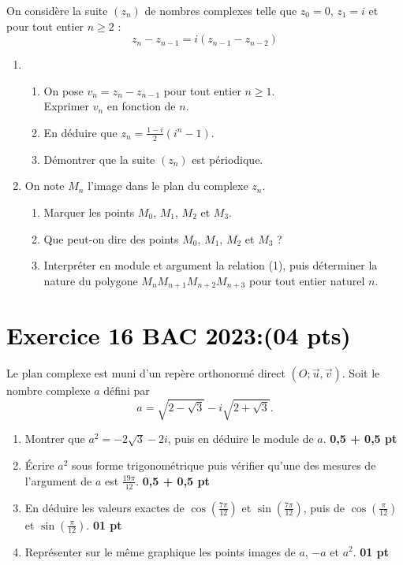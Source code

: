 \documentclass[12pt]{article}
\begin{document}
On considère la suite $(z_n)$ de nombres complexes telle que $z_0 = 0$, $z_1 = i$ et pour tout entier $n \geq 2$ :
\[
z_n - z_{n-1} = i(z_{n-1} - z_{n-2}) \tag{1}
\]

\begin{enumerate}
    \item
    \begin{enumerate}
        \item On pose $v_n = z_n - z_{n-1}$ pour tout entier $n \geq 1$. \\
        Exprimer $v_n$ en fonction de $n$.

        \item En déduire que $z_n = \frac{1 - i}{2}(i^n - 1)$.

        \item Démontrer que la suite $(z_n)$ est périodique.
    \end{enumerate}

    \item On note $M_n$ l’image dans le plan du complexe $z_n$.
    \begin{enumerate}
        \item Marquer les points $M_0$, $M_1$, $M_2$ et $M_3$.

        \item Que peut-on dire des points $M_0$, $M_1$, $M_2$ et $M_3$ ?

        \item Interpréter en module et argument la relation (1), puis déterminer la nature du polygone $M_nM_{n+1}M_{n+2}M_{n+3}$ pour tout entier naturel $n$.
    \end{enumerate}
\end{enumerate}
\section*{\textcolor{black}{Exercice 16 BAC 2023:(04 pts)}}

Le plan complexe est muni d’un repère orthonormé direct $(O; \vec{u}, \vec{v})$. Soit le nombre complexe $a$ défini par 
\[
a = \sqrt{2 - \sqrt{3}} - i\sqrt{2 + \sqrt{3}}.
\]

\begin{enumerate}
    \item Montrer que $a^2 = -2\sqrt{3} - 2i$, puis en déduire le module de $a$. \hfill \textbf{0,5 + 0,5 pt}

    \item Écrire $a^2$ sous forme trigonométrique puis vérifier qu’une des mesures de l’argument de $a$ est $\frac{19\pi}{12}$. \hfill \textbf{0,5 + 0,5 pt}

    \item En déduire les valeurs exactes de $\cos\left(\frac{7\pi}{12}\right)$ et $\sin\left(\frac{7\pi}{12}\right)$, puis de $\cos\left(\frac{\pi}{12}\right)$ et $\sin\left(\frac{\pi}{12}\right)$. \hfill \textbf{01 pt}

    \item Représenter sur le même graphique les points images de $a$, $-a$ et $a^2$. \hfill \textbf{01 pt}
\end{enumerate}
\end{document}
